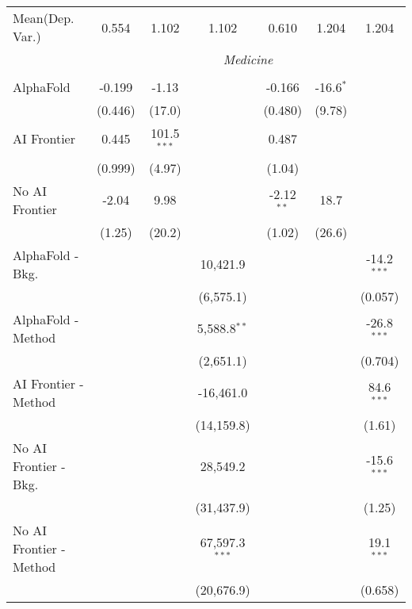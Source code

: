 \begin{tabular}{lcccccc}
Mean(Dep. Var.) & 0.554 & 1.102 & 1.102 & 0.610 & 1.204 & 1.204 \\
 & \multicolumn{6}{c}{\textit{Medicine}} \\ \\
   AlphaFold               & -0.199  & -1.13         &                  & -0.166       & -16.6$^{*}$ &   \\   
                           & (0.446) & (17.0)        &                  & (0.480)      & (9.78)      &   \\   
   AI Frontier             & 0.445   & 101.5$^{***}$ &                  & 0.487        &             &   \\   
                           & (0.999) & (4.97)        &                  & (1.04)       &             &   \\   
   No AI Frontier          & -2.04   & 9.98          &                  & -2.12$^{**}$ & 18.7        &   \\   
                           & (1.25)  & (20.2)        &                  & (1.02)       & (26.6)      &   \\   
   AlphaFold - Bkg.        &         &               & 10,421.9         &              &             & -14.2$^{***}$\\   
                           &         &               & (6,575.1)        &              &             & (0.057)\\   
   AlphaFold - Method      &         &               & 5,588.8$^{**}$   &              &             & -26.8$^{***}$\\   
                           &         &               & (2,651.1)        &              &             & (0.704)\\   
   AI Frontier - Method    &         &               & -16,461.0        &              &             & 84.6$^{***}$\\   
                           &         &               & (14,159.8)       &              &             & (1.61)\\   
   No AI Frontier - Bkg.   &         &               & 28,549.2         &              &             & -15.6$^{***}$\\   
                           &         &               & (31,437.9)       &              &             & (1.25)\\   
   No AI Frontier - Method &         &               & 67,597.3$^{***}$ &              &             & 19.1$^{***}$\\   
                           &         &               & (20,676.9)       &              &             & (0.658)\\   

\end{tabular}
